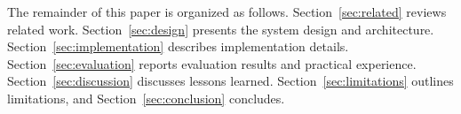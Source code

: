The remainder of this paper is organized as follows. Section~\ref{sec:related}
reviews related work. Section~\ref{sec:design} presents the system design and
architecture. Section~\ref{sec:implementation} describes implementation
details. Section~\ref{sec:evaluation} reports evaluation results and practical
experience. Section~\ref{sec:discussion} discusses lessons learned.
Section~\ref{sec:limitations} outlines limitations, and Section~\ref{sec:conclusion}
concludes.
